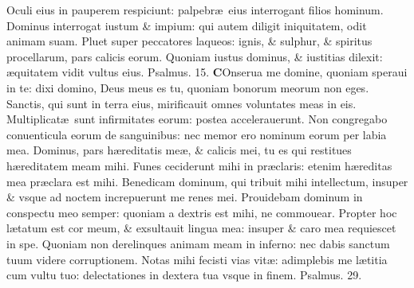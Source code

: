 \documentclass[a5paper,10pt]{book}
\def\ae{æ}
\begin{document}
\begin{multicols*}{2}
\newline \color{red} O\color{black}culi eius in pauperem respiciunt: palpebr\ae \ eius interrogant filios hominum.
\newline \color{red} D\color{black}ominus interrogat iustum \& impium: qui autem diligit iniquitatem, odit animam suam.
\newline \color{red} P\color{black}luet super peccatores laqueos: ignis, \& sulphur, \& spiritus procellarum, pars calicis eorum.
\newline \color{red} Q\color{black}uoniam iustus dominus, \& iustitias dilexit: \ae quitatem vidit vultus eius.
\newline \color{red} Psalmus. 15. \color{black}
\lettrine[lines=2]{\bfseries \color{red} C}{}Onserua me domine, quoniam speraui in te: dixi domino, Deus meus es tu, quoniam bonorum meorum non eges.
\newline \color{red} S\color{black}anctis, qui sunt in terra eius, mirificauit omnes voluntates meas in eis.
\newline \color{red} M\color{black}ultiplicat\ae \ sunt infirmitates eorum: postea accelerauerunt.
\newline \color{red} N\color{black}on congregabo conuenticula eorum de sanguinibus: nec memor ero nominum eorum per labia mea.
\newline \color{red} D\color{black}ominus, pars h\ae reditatis me\ae , \& calicis mei, tu es qui restitues h\ae reditatem meam mihi.
\newline \color{red} F\color{black}unes ceciderunt mihi in pr\ae claris: etenim h\ae reditas mea pr\ae clara est mihi.
\newline \color{red} B\color{black}enedicam dominum, qui tribuit mihi intellectum, insuper \& vsque ad noctem increpuerunt me renes mei.
\newline \color{red} P\color{black}rouidebam dominum in conspectu meo semper: quoniam a dextris est mihi, ne commouear.
\newline \color{red} P\color{black}ropter hoc l\ae tatum est cor meum, \& exsultauit lingua mea: insuper \& caro mea requiescet in spe.
\newline \color{red} Q\color{black}uoniam non derelinques animam meam in inferno: nec dabis sanctum tuum videre corruptionem.
\newline \color{red} N\color{black}otas mihi fecisti vias vit\ae : adimplebis me l\ae titia cum vultu tuo: delectationes in dextera tua vsque in finem.
\newline \color{red} Psalmus. 29. \color{black}

\end{multicols*}
\end{document}
